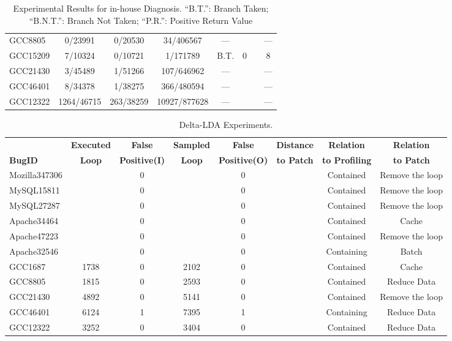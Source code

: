 \begin{table*}
\begin{tabular}{lccccccc}
    GCC8805                & 0/23991    & 0/20530          & 34/406567    & ---  &   &        & --- \\
    GCC15209               & 7/10324    & 0/10721          &  1/171789    & B.T. & 0 &        & 8 \\
    GCC21430               & 3/45489    & 1/51266          & 107/646962   & ---  &   &        & --- \\
    GCC46401               & 8/34378    & 1/38275          & 366/480594   & ---  &   &        & ---\\
    GCC12322               & 1264/46715 & 263/38259        & 10927/877628 & ---  &   &        & --- \\
    \bottomrule
   \end{tabular}
  \nocaptionrule
  \caption{Experimental Results for in-house Diagnosis. ``B.T.'': Branch Taken; ``B.N.T.'': Branch Not Taken; ``P.R.'': Positive Return Value}
  \label{tab:in-house}
\end{table*}

\begin{table*}[h!]
  \centering
  \small
  \begin{tabular}{lccccccc}
    \toprule    
              & {\bf Executed} & {\bf False}        & {\bf Sampled} & {\bf False}       & {\bf Distance} &{\bf Relation}    & {\bf Relation}\\ 
 {\bf BugID}  & {\bf Loop}     & {\bf Positive(I)}  & {\bf Loop }   & {\bf Positive(O)} & {\bf to Patch} &{\bf to Profiling}&{\bf to Patch} \\
    \midrule
    Mozilla347306          &        & 0 &    & 0 &  & Contained  & Remove the loop\\
    \midrule
    MySQL15811             &        & 0 &    & 0 &  & Contained  & Remove the loop\\
    MySQL27287             &        & 0 &    & 0 &  & Contained  & Remove the loop\\
    \midrule
    Apache34464            &        & 0 &    & 0 &  & Contained  & Cache \\
    Apache47223            &        & 0 &    & 0 &  & Contained  & Remove the loop\\
    Apache32546            &        & 0 &    & 0 &  & Containing & Batch \\
    \midrule
    GCC1687                & 1738   & 0 &  2102  & 0 &  & Contained  & Cache\\
    GCC8805                & 1815   & 0 &  2593  & 0 &  & Contained  & Reduce Data\\
    GCC21430               & 4892   & 0 &  5141  & 0 &  & Contained  & Remove the loop\\
    GCC46401               & 6124   & 1 &  7395  & 1 &  & Containing & Reduce Data\\
    GCC12322               & 3252   & 0 &  3404  & 0 &  & Contained  & Reduce Data\\
    \bottomrule
   \end{tabular}
  \nocaptionrule
  \caption{Delta-LDA Experiments.}
  \label{tab:LDA}
\end{table*}

